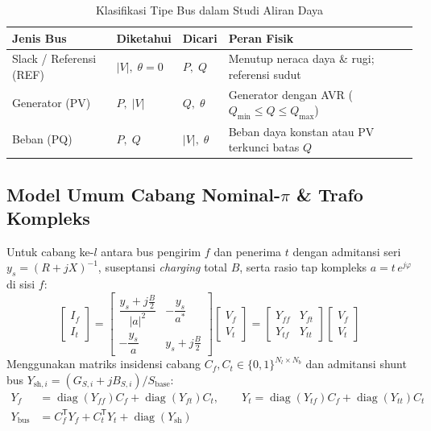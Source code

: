 \documentclass[11pt,a4paper]{report}
\begin{document}
\begin{table}[H]
\centering
\caption{Klasifikasi Tipe Bus dalam Studi Aliran Daya}
\small
\begin{tabular}{@{}llll@{}}
\toprule
\textbf{Jenis Bus} & \textbf{Diketahui} & \textbf{Dicari} & \textbf{Peran Fisik} \\
\midrule
Slack / Referensi (REF) & $|V|,\; \theta = 0$ & $P,\; Q$ & Menutup neraca daya \& rugi; referensi sudut \\
Generator (PV) & $P,\; |V|$ & $Q,\; \theta$ & Generator dengan AVR ($Q_{\min} \le Q \le Q_{\max}$) \\
Beban (PQ) & $P,\; Q$ & $|V|,\; \theta$ & Beban daya konstan atau PV terkunci batas $Q$ \\
\bottomrule
\end{tabular}
\end{table}

\subsection{Model Umum Cabang Nominal-$\pi$ \& Trafo Kompleks}
Untuk cabang ke-$l$ antara bus pengirim $f$ dan penerima $t$ dengan admitansi seri $y_s = (R + jX)^{-1}$, suseptansi \textit{charging} total $B$, serta rasio tap kompleks $a = t\,e^{j\varphi}$ di sisi $f$:
\begin{equation}
  \begin{bmatrix} I_f \\ I_t \end{bmatrix} =
  \begin{bmatrix}
    \dfrac{y_s + j\frac{B}{2}}{|a|^2} & -\dfrac{y_s}{a^*} \\[10pt]
    -\dfrac{y_s}{a} & y_s + j\frac{B}{2}
  \end{bmatrix}
  \begin{bmatrix} V_f \\ V_t \end{bmatrix}
  =
  \begin{bmatrix} Y_{ff} & Y_{ft} \\ Y_{tf} & Y_{tt} \end{bmatrix}
  \begin{bmatrix} V_f \\ V_t \end{bmatrix}
\end{equation}
Menggunakan matriks insidensi cabang $C_f, C_t \in \{0,1\}^{N_l \times N_b}$ dan admitansi shunt bus $Y_{\text{sh},i} = (G_{S,i} + jB_{S,i})/S_{\text{base}}$:
\begin{align}
  Y_f &= \operatorname{diag}(Y_{ff}) C_f + \operatorname{diag}(Y_{ft}) C_t, \qquad
  Y_t = \operatorname{diag}(Y_{tf}) C_f + \operatorname{diag}(Y_{tt}) C_t \\
  Y_{\text{bus}} &= C_f^{\mathsf{T}} Y_f + C_t^{\mathsf{T}} Y_t + \operatorname{diag}(Y_{\text{sh}})
\end{align}
\end{document}
